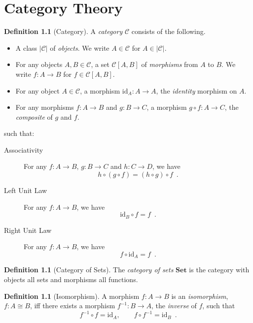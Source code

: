 \documentclass{book}
\theoremstyle{definition}
\newtheorem{df}[lm]{Definition}
\newcommand{\id}[1]{\ensuremath{\mathrm{id}_{#1}}}
\newcommand{\inv}[1]{\ensuremath{{#1}^{-1}}}
\newcommand{\Set}{\ensuremath{\mathbf{Set}}}
\begin{document}
  \chapter{Category Theory}
  
  \begin{df}[Category]
    A \emph{category} $\mathcal{C}$ consists of the following.
    \begin{itemize}
      \item A class $|\mathcal{C}|$ of \emph{objects}. We write $A \in
      \mathcal{C}$ for $A \in |\mathcal{C}|$.
      \item For any objects $A, B \in \mathcal{C}$, a set $\mathcal{C}[A,B]$ of
      \emph{morphisms} from $A$ to $B$. We write $f:A\rightarrow B$ for
      $f\in\mathcal{C}[A,B]$.
      \item For any object $A \in \mathcal{C}$, a morphism $\id{A} : A
      \rightarrow A$, the \emph{identity} morphism on $A$.
      \item For any morphisms $f : A \rightarrow B$ and $g : B \rightarrow C$, a
      morphism $g \circ f : A \rightarrow C$, the \emph{composite} of $g$ and 
      $f$.
    \end{itemize}
    such that:
    \begin{description}
      \item[Associativity]
      For any $f : A \rightarrow B$, $g : B \rightarrow C$ and $h : C 
      \rightarrow
      D$, we have
      \[ h \circ (g \circ f) = (h \circ g) \circ f \enspace . \]
      \item[Left Unit Law]
      For any $f : A \rightarrow B$, we have
      \[ \id{B} \circ f = f \enspace . \]
      \item[Right Unit Law]
      For any $f : A \rightarrow B$, we have
      \[ f \circ \id{A} = f \enspace . \]
    \end{description}
  \end{df}
  
  \begin{df}[Category of Sets]
    The \emph{category of sets} $\Set$ is the category with objects all
    sets and morphisms all functions.
  \end{df}
  
  \begin{df}[Isomorphism]
    A morphism $f : A \rightarrow B$ is an \emph{isomorphism}, $f : A \cong B$,
    iff there exists a morphism $\inv{f} : B \rightarrow A$, the \emph{inverse} 
    of
    $f$, such that
    \[ \inv{f} \circ f = \id{A}, \qquad f \circ \inv{f} = \id{B} \enspace . \]
  \end{df}
  
\end{document}
